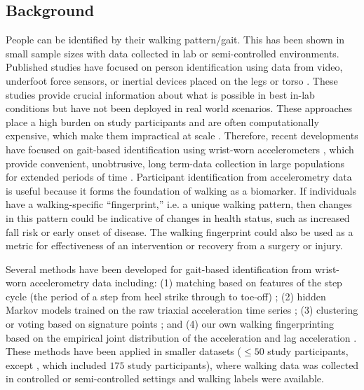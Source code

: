 \subsection{Background}\label{subsec:background}
People can be identified by their walking pattern/gait. This has been shown in small sample sizes with data collected in lab or semi-controlled environments. Published studies have focused on person identification using data from video, underfoot force sensors, or inertial devices placed on the legs or torso \citep{connor_biometric_2018}. These studies provide crucial information about what is possible in best in-lab conditions but have not been deployed in real world scenarios. These approaches place a high burden on study participants and are often computationally expensive, which make them impractical at scale \citep{gait_survey, gait_survey2}. Therefore, recent developments have focused on gait-based identification using wrist-worn accelerometers \citep{connor_biometric_2018}, which provide convenient, unobtrusive, long term-data collection in large populations for extended periods of time \citep{karas_accelerometry_2019}. Participant identification from accelerometry data is useful because it forms the foundation of walking as a biomarker. If individuals have a walking-specific ``fingerprint,'' i.e. a unique walking pattern, then changes in this pattern could be indicative of changes in health status, such as increased fall risk or early onset of disease. The walking fingerprint could also be used as a metric for effectiveness of an intervention or recovery from a surgery or injury.

Several methods have been developed for gait-based identification from wrist-worn accelerometry data including: (1) matching based on features of the step cycle (the period of a step from heel strike through to toe-off) \citep{mantyjarvi_identifying_2005, derawi_unobtrusive_2010, gafurov_biometric_2006, gafurov_improved_2010, derawi_unobtrusive_2010, rong_wearable_2007}; (2) hidden Markov models trained on the raw triaxial acceleration time series \citep{hmm}; (3) clustering or voting based on signature points \citep{signature_points, zju_data}; and (4) our own walking fingerprinting based on the empirical joint distribution of the acceleration and lag acceleration \citep{Koffman2023, Koffman2024}. These methods have been applied in smaller datasets ($\leq 50$ study participants, except \cite{zju_data}, which included $175$ study participants), where walking data was collected in controlled or semi-controlled settings and walking labels were available.  

